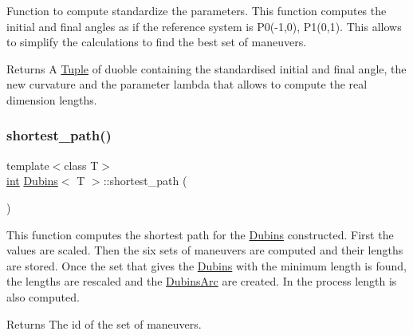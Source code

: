 Function to compute standardize the parameters. This function computes the initial and final angles as if the reference system is P0(-\/1,0), P1(0,1). This allows to simplify the calculations to find the best set of maneuvers. 

\begin{DoxyReturn}{Returns}
A {\ttfamily \mbox{\hyperlink{class_tuple}{Tuple}}} of {\ttfamily duoble} containing the standardised initial and final angle, the new curvature and the parameter lambda that allows to compute the real dimension lengths. 
\end{DoxyReturn}
\mbox{\label{class_dubins_a52681fe06e50899b5296204a312233ce}} 
\subsubsection{\texorpdfstring{shortest\_path()}{shortest\_path()}}
{\footnotesize\ttfamily template$<$class T$>$ \\
\mbox{\hyperlink{draw_8hh_aa620a13339ac3a1177c86edc549fda9b}{int}} \mbox{\hyperlink{class_dubins}{Dubins}}$<$ T $>$\+::shortest\+\_\+path (\begin{DoxyParamCaption}{ }\end{DoxyParamCaption})\hspace{0.3cm}{\ttfamily [inline]}}



This function computes the shortest path for the \mbox{\hyperlink{class_dubins}{Dubins}} constructed. First the values are scaled. Then the six sets of maneuvers are computed and their lengths are stored. Once the set that gives the \mbox{\hyperlink{class_dubins}{Dubins}} with the minimum length is found, the lengths are rescaled and the {\ttfamily \mbox{\hyperlink{class_dubins_arc}{Dubins\+Arc}}} are created. In the process length is also computed. 

\begin{DoxyReturn}{Returns}
The id of the set of maneuvers. 
\end{DoxyReturn}
\mbox{\label{class_dubins_a68d6703215b12b2933346efd77563575}} 
